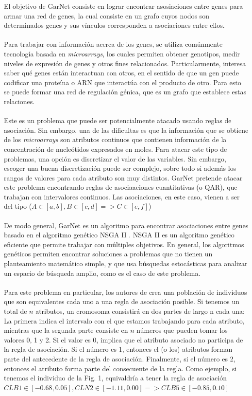 \documentclass[12pt,spanish]{article}
\begin{document}
El objetivo de GarNet \cite{gene} consiste en lograr encontrar asosiaciones entre genes para armar una red de genes, la cual consiste en un grafo cuyos nodos son determinados genes y sus vínculos corresponden a asociaciones entre ellos.
\\ \\
Para trabajar con información acerca de los genes, se utiliza comúnmente tecnología basada en \emph{microarrays}, los cuales permiten obtener genotipos, medir niveles de expresión de genes y otros fines relacionados. Particularmente, interesa saber qué genes están interactuan con otros, en el sentido de que un gen puede codificar una proteína o ARN que interactúa con el producto de otro. Para esto se puede formar una red de regulación génica, que es un grafo que establece estas relaciones.
\\\\
Este es un problema que puede ser potencialmente atacado usando reglas de asociación. Sin embargo, una de las dificultas es que la información que se obtiene de los \emph{microarrays} son atributos continuos que contienen informaci\'on de la concentraci\'on de nucle\'otidos expresados en moles. Para atacar este tipo de problemas, una opci\'on es discretizar el valor de las variables. Sin embargo, escoger una buena discretizaci\'on puede ser complejo, sobre todo si adem\'as los rangos de valores para cada atributo son muy distintos. GarNet \cite{gene} pretende atacar este problema encontrando reglas de asociaaciones cuantitativas (o QAR), que trabajan con intervalores continuos. Las asociaciones, en este caso, vienen a ser del tipo ($A \in [a,b], B \in [c, d] => C \in [e, f]$)
\\\\
De modo general, GarNet es un algoritmo para encontrar asociaciones entre genes basado en el algoritmo genético NSGA II \cite{nsga}. NSGA II es un algoritmo genético eficiente que permite trabajar con múltiples objetivos. En general, los algoritmos genéticos permiten encontrar soluciones a problemas que no tienen un planteamiento matemático simple, y que usa búsquedas estocásticas para analizar un espacio de búsqueda amplio, como es el caso de este problema. 
\\\\
Para este problema en particular, los autores de \cite{gene} crea una población de individuos que son equivalentes cada uno a una regla de asociación posible. Si tenemos un total de $n$ atributos, un cromosoma consistir\'a en dos partes de largo n cada una: La primera indica el intervalo con el que estamos trabajando para cada atributo, mientras que la segunda parte consiste en $n$ n\'umeros que pueden tomar los valores 0, 1 y 2. Si el valor es 0, implica que el atributo asociado no participa de la regla de asociaci\'on. Si el n\'umero es 1, entonces el (o los) atributos forman parte del antecedente de la regla de asociaci\'on. Finalmente, si el n\'umero es 2, entonces el atributo forma parte del consecuente de la regla. Como ejemplo, si tenemos el individuo de la Fig. 1, equivaldr\'ia a tener la regla de asociaci\'on $CLB1 \in [-0.68, 0.05], CLN2 \in [-1.11, 0.00] => CLB5 \in [-0.85, 0.10]$
\\
\end{document}
